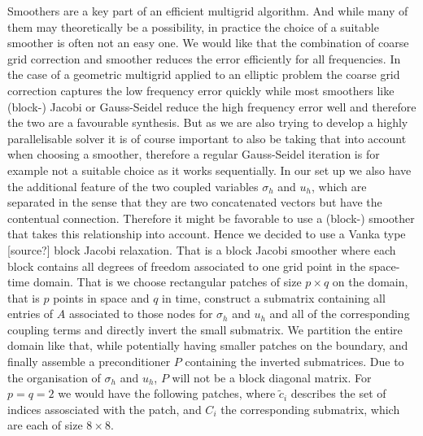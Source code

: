 \documentclass[../draft_1.tex]{subfiles}
\begin{document}
Smoothers are a key part of an efficient multigrid algorithm. And while many of them may theoretically be a possibility, in practice the choice of a suitable smoother is often not an easy one. We would like that the combination of coarse grid correction and smoother reduces the error efficiently for all frequencies. In the case of a geometric multigrid applied to an elliptic problem the coarse grid correction captures the low frequency error quickly while most smoothers like (block-) Jacobi or Gauss-Seidel reduce the high frequency error well and therefore the two are a favourable synthesis. But as we are also trying to develop a highly parallelisable solver it is of course important to also be taking that into account when choosing a smoother, therefore a regular Gauss-Seidel iteration is for example not a suitable choice as it works sequentially. In our set up we also have the additional feature of the two coupled variables $\sigma_h$ and $u_h$, which are separated in the sense that they are two concatenated vectors but have the contentual connection. Therefore it might be favorable to use a (block-) smoother that takes this relationship into account. Hence we decided to use a Vanka type [source?] block Jacobi relaxation. That is a block Jacobi smoother where each block contains all degrees of freedom associated to one grid point in the space-time domain. That is we choose rectangular patches of size $p \times q$ on the domain, that is $p$ points in space and $q$ in time, construct a submatrix containing all entries of $A$ associated to those nodes for $\sigma_h$ and $u_h$ and all of the corresponding coupling terms and directly invert the small submatrix. We partition the entire domain like that, while potentially having smaller patches on the boundary, and finally assemble a preconditioner $P$ containing the inverted submatrices. Due to the organisation of $\sigma_h$ and $u_h$, $P$ will not be a block diagonal matrix. For $p = q = 2 $ we would have the following patches, where $\tilde{c}_i$ describes the set of indices assosciated with the patch, and $C_i$ the corresponding submatrix, which are each of size $8 \times 8$. 
\end{document}

